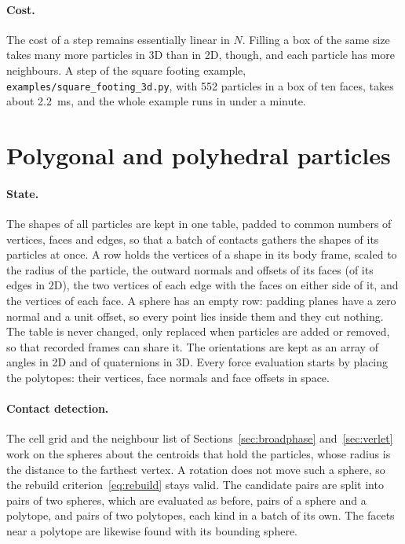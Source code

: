 \paragraph{Cost.}
The cost of a step remains essentially linear in $N$.
Filling a box of the same size takes many more particles in 3D than in 2D, though, and each particle has more neighbours.
A step of the square footing example, \texttt{examples/square\_footing\_3d.py}, with \num{552} particles in a box of ten faces, takes about \qty{2.2}{\milli\second}, and the whole example runs in under a minute.

\section{Polygonal and polyhedral particles}
\label{sec:polytope-numerics}

\paragraph{State.}
The shapes of all particles are kept in one table, padded to common numbers of vertices, faces and edges, so that a batch of contacts gathers the shapes of its particles at once.
A row holds the vertices of a shape in its body frame, scaled to the radius of the particle, the outward normals and offsets of its faces (of its edges in 2D), the two vertices of each edge with the faces on either side of it, and the vertices of each face.
A sphere has an empty row: padding planes have a zero normal and a unit offset, so every point lies inside them and they cut nothing.
The table is never changed, only replaced when particles are added or removed, so that recorded frames can share it.
The orientations are kept as an array of angles in 2D and of quaternions in 3D.
Every force evaluation starts by placing the polytopes: their vertices, face normals and face offsets in space.

\paragraph{Contact detection.}
The cell grid and the neighbour list of Sections~\ref{sec:broadphase} and~\ref{sec:verlet} work on the spheres about the centroids that hold the particles, whose radius is the distance to the farthest vertex.
A rotation does not move such a sphere, so the rebuild criterion~\eqref{eq:rebuild} stays valid.
The candidate pairs are split into pairs of two spheres, which are evaluated as before, pairs of a sphere and a polytope, and pairs of two polytopes, each kind in a batch of its own.
The facets near a polytope are likewise found with its bounding sphere.

